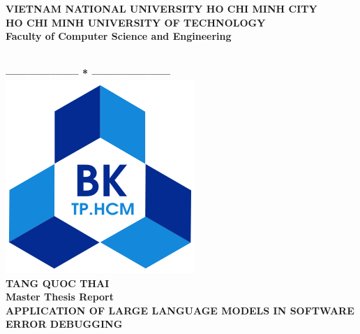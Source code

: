 \documentclass[a4paper,oneside]{book}
\begin{document}
\begin{titlepage}
    \thispagestyle{empty}
    \usetikzlibrary{calc}

    \begin{center}
        \begin{large}
            {\fontsize{12pt}{1}\textbf{VIETNAM NATIONAL UNIVERSITY HO CHI MINH CITY}} \\
            \fontsize{12pt}{1}\textbf{HO CHI MINH UNIVERSITY OF TECHNOLOGY} \\
            \fontsize{12pt}{1}\textbf{Faculty of Computer Science and Engineering}
        \end{large} \\
        \textbf{--------------------  *  ---------------------}\\

        \vspace{0.8cm}
        \includegraphics[scale=.35]{img/hcmut}\\
        \vspace{0.8cm}
        {\fontsize{14.4pt}{1}\selectfont \textbf{TANG QUOC THAI}}\\[.75cm]
        \vspace{0.8cm}
        {\fontsize{14.4pt}{1}\selectfont \textbf{Master Thesis Report}}\\[.75cm]
        {\fontsize{17pt}{1}\selectfont \textbf{\MakeUppercase{APPLICATION OF LARGE LANGUAGE MODELS IN SOFTWARE ERROR DEBUGGING}}}
    \end{center}
    \vspace{.4cm}


\end{titlepage}
\end{document}

